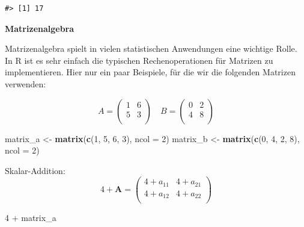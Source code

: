 \documentclass[]{tufte-book}
\newenvironment{Shaded}{}{}
\newcommand{\KeywordTok}[1]{\textcolor[rgb]{0.00,0.44,0.13}{\textbf{#1}}}
\newcommand{\DataTypeTok}[1]{\textcolor[rgb]{0.56,0.13,0.00}{#1}}
\newcommand{\DecValTok}[1]{\textcolor[rgb]{0.25,0.63,0.44}{#1}}
\newcommand{\StringTok}[1]{\textcolor[rgb]{0.25,0.44,0.63}{#1}}
\newcommand{\OperatorTok}[1]{\textcolor[rgb]{0.40,0.40,0.40}{#1}}
\newcommand{\NormalTok}[1]{#1}
\begin{document}
\begin{verbatim}
#> [1] 17
\end{verbatim}

\textbf{Matrizenalgebra}

Matrizenalgebra spielt in vielen statistischen Anwendungen eine wichtige
Rolle. In R ist es sehr einfach die typischen Rechenoperationen für
Matrizen zu implementieren. Hier nur ein paar Beispiele, für die wir die
folgenden Matrizen verwenden:

\[A = \left( 
\begin{array}{rrr}                                
1 & 6 \\                                               
5 & 3 \\                                               
\end{array}
\right) \quad B = \left( 
\begin{array}{rrr}                                
0 & 2 \\                                               
4 & 8 \\                                               
\end{array}\right)\]

\begin{Shaded}
\begin{Highlighting}[]
\NormalTok{matrix_a <-}\StringTok{ }\KeywordTok{matrix}\NormalTok{(}\KeywordTok{c}\NormalTok{(}\DecValTok{1}\NormalTok{, }\DecValTok{5}\NormalTok{, }\DecValTok{6}\NormalTok{, }\DecValTok{3}\NormalTok{), }\DataTypeTok{ncol =} \DecValTok{2}\NormalTok{)}
\NormalTok{matrix_b <-}\StringTok{ }\KeywordTok{matrix}\NormalTok{(}\KeywordTok{c}\NormalTok{(}\DecValTok{0}\NormalTok{, }\DecValTok{4}\NormalTok{, }\DecValTok{2}\NormalTok{, }\DecValTok{8}\NormalTok{), }\DataTypeTok{ncol =} \DecValTok{2}\NormalTok{)}
\end{Highlighting}
\end{Shaded}

Skalar-Addition: \[4+\boldsymbol{A}=
\left( 
\begin{array}{rrr}                                
4+a_{11} & 4+a_{21} \\                                               
4+a_{12} & 4+a_{22} \\                                               
\end{array}
\right)\]

\begin{Shaded}
\begin{Highlighting}[]
\DecValTok{4} \OperatorTok{+}\StringTok{ }\NormalTok{matrix_a}
\end{Highlighting}
\end{Shaded}
\end{document}
